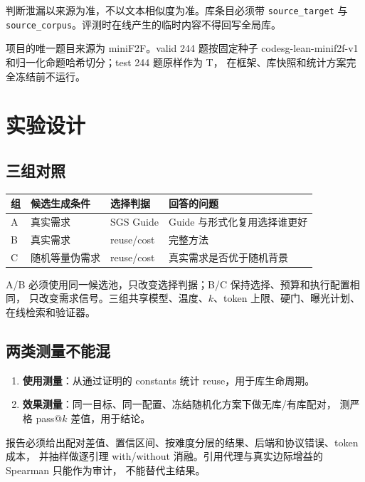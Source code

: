 \documentclass[UTF8,a4paper,11pt,fontset=windows]{ctexart}
\newcommand{\code}[1]{\texttt{\small #1}}
\begin{document}
判断泄漏以来源为准，不以文本相似度为准。库条目必须带 \code{source\_target} 与
\code{source\_corpus}。评测时在线产生的临时内容不得回写全局库。

项目的唯一题目来源为 miniF2F。valid 244 题按固定种子
code{sg-lean-minif2f-v1} 和归一化命题哈希切分；test 244 题原样作为 T，
在框架、库快照和统计方案完全冻结前不运行。

\section{实验设计}

\subsection{三组对照}

\begin{table}[htbp]
\centering
\small
\begin{tabularx}{\textwidth}{@{}p{1.2cm}p{3.4cm}p{3.4cm}Y@{}}
\toprule
\textbf{组} & \textbf{候选生成条件} & \textbf{选择判据} & \textbf{回答的问题} \\
\midrule
A & 真实需求 & SGS Guide & Guide 与形式化复用选择谁更好 \\
B & 真实需求 & reuse/cost & 完整方法 \\
C & 随机等量伪需求 & reuse/cost & 真实需求是否优于随机背景 \\
\bottomrule
\end{tabularx}
\end{table}

A/B 必须使用同一候选池，只改变选择判据；B/C 保持选择、预算和执行配置相同，
只改变需求信号。三组共享模型、温度、$k$、token 上限、硬门、曝光计划、在线检索和验证器。

\subsection{两类测量不能混}

\begin{enumerate}[leftmargin=1.8em,itemsep=4pt]
  \item \textbf{使用测量}：从通过证明的 constants 统计 reuse，用于库生命周期。
  \item \textbf{效果测量}：同一目标、同一配置、冻结随机化方案下做无库/有库配对，
        测严格 pass@$k$ 差值，用于结论。
\end{enumerate}

报告必须给出配对差值、置信区间、按难度分层的结果、后端和协议错误、token 成本，
并抽样做逐引理 with/without 消融。引用代理与真实边际增益的 Spearman 只能作为审计，
不能替代主结果。
\end{document}
